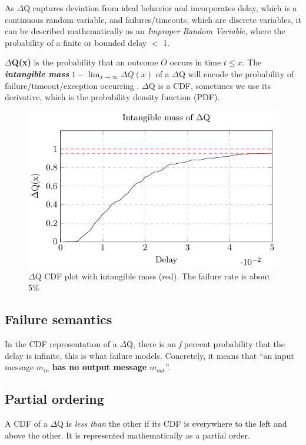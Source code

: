     As $\Delta$Q captures deviation from ideal behavior and incorporates delay, which is a continuous random variable, and failures/timeouts, which are discrete variables, it can be described mathematically as an \textit{Improper Random Variable}, where the probability of a finite or bounded delay $<$ 1. 

    \textbf{$\Delta$Q(x)} is the probability that an outcome $O$ occurs in time $t \le x$. The \textbf{\textit{intangible mass}} $1 - \lim_{x\to\infty}\Delta Q(x)$ of a $\Delta$Q will encode the probability of failure/timeout/exception occurring \cite{myo}. $\Delta$Q is a CDF, sometimes we use its derivative, which is the probability density function (PDF).
    
    \begin{figure}[H]
        \begin{center}
            \includegraphics{tikz/intangible.pdf}
        \end{center}
        \caption{$\Delta$Q CDF plot with intangible mass (red). The failure rate is about 5\% }
    \end{figure}
   
  \subsection{Failure semantics}
       In the CDF representation of a $\Delta$Q, there is an \textit{f} percent probability that the delay is infinite, this is what failure models. 
        Concretely, it means that ``an input message $m_{in}$ \textbf{has no output message} $m_{out}$''. \cite{art}
   
    \subsection{Partial ordering}
        A CDF of a $\Delta$Q is \textit{less than} the other if its CDF is everywhere to the left and above the other. It is represented mathematically as a partial order. 
        
